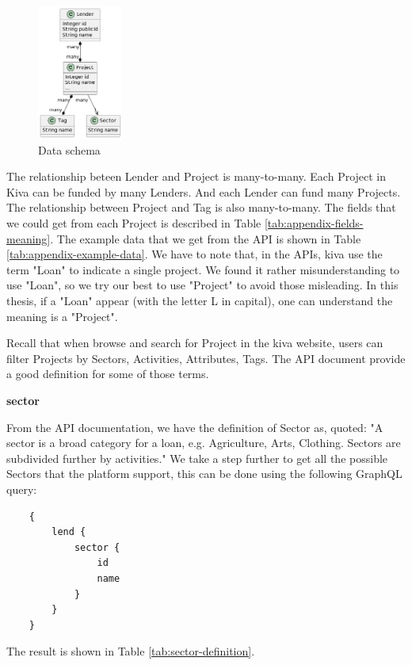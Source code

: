 \begin{figure}[H]
	\centering
	\includegraphics[width=0.25\textwidth]{images/graphuml/dataschema.png}
	\caption{Data schema}
	\label{fig:data-schema}
\end{figure}

The relationship beteen Lender and Project is many-to-many.
Each Project in Kiva can be funded by many Lenders.
And each Lender can fund many Projects.
The relationship between Project and Tag is also many-to-many.
The fields that we could get from each Project is described in Table \ref{tab:appendix-fields-meaning}.
The example data that we get from the API is shown in Table \ref{tab:appendix-example-data}.
We have to note that, in the APIs, kiva use the term "Loan" to indicate a single project.
We found it rather misunderstanding to use "Loan", so we try our best to use "Project" to avoid those misleading.
In this thesis, if a "Loan" appear (with the letter L in capital), one can understand the meaning is a "Project".

Recall that when browse and search for Project in the kiva website,
users can filter Projects by Sectors, Activities, Attributes, Tags.
The API document provide a good definition for some of those terms.

\textbf{\Gls{sector}}

From the API documentation, we have the definition of Sector as, quoted:
"A sector is a broad category for a loan, e.g. Agriculture, Arts, Clothing. Sectors are subdivided further by activities."
We take a step further to get all the possible Sectors that the platform support,
this can be done using the following GraphQL query:

\begin{lstlisting}
    {
        lend {
            sector {
                id
                name
            }
        }
    }
\end{lstlisting}

The result is shown in Table \ref{tab:sector-definition}.

